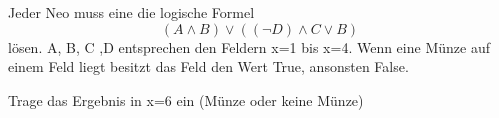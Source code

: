 \excercise{}
Jeder Neo muss eine die logische Formel
$$
(A \land B) \lor ((\neg D) \land C \lor B)
$$
lösen.
A, B, C ,D entsprechen den Feldern x=1 bis x=4. Wenn eine Münze auf einem Feld liegt besitzt das Feld den Wert True, ansonsten False.

Trage das Ergebnis in x=6 ein (Münze oder keine Münze)
